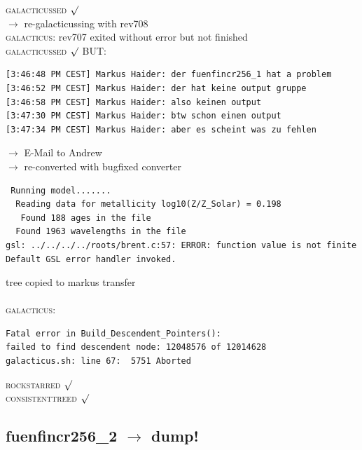 \textsc{galacticussed} $\surd$ \\
$\rightarrow$ re-galacticussing with rev708 \\
\textsc{galacticus:} rev707 exited without error but not finished \\
\textsc{galacticussed} $\surd$
BUT: 
\begin{verbatim}
[3:46:48 PM CEST] Markus Haider: der fuenfincr256_1 hat a problem
[3:46:52 PM CEST] Markus Haider: der hat keine output gruppe
[3:46:58 PM CEST] Markus Haider: also keinen output
[3:47:30 PM CEST] Markus Haider: btw schon einen output
[3:47:34 PM CEST] Markus Haider: aber es scheint was zu fehlen
\end{verbatim}
$\rightarrow$ E-Mail to Andrew \\
$\rightarrow$ re-converted with bugfixed converter \\
\begin{verbatim}
 Running model....... 
  Reading data for metallicity log10(Z/Z_Solar) = 0.198
   Found 188 ages in the file
  Found 1963 wavelengths in the file
gsl: ../../../../roots/brent.c:57: ERROR: function value is not finite
Default GSL error handler invoked.
\end{verbatim}
tree copied to markus transfer \\
\\ \textsc{galacticus}: 
\begin{verbatim}
Fatal error in Build_Descendent_Pointers():
failed to find descendent node: 12048576 of 12014628
galacticus.sh: line 67:  5751 Aborted  
\end{verbatim}
\textsc{rockstarred} $\surd$ \\ \textsc{consistenttreed} $\surd$

% 
%
%
%
%
%
%
%


\newpage
\subsection{fuenfincr256\_2 $\rightarrow$ dump!}

